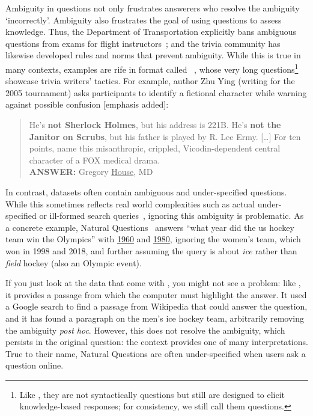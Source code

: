Ambiguity in questions not only frustrates answerers who resolve the ambiguity `incorrectly'.
Ambiguity also frustrates the goal of using questions to assess knowledge.
Thus, the  Department of Transportation explicitly bans ambiguous questions from exams for flight instructors~\cite{dot-08}; and the trivia community has likewise developed rules and norms that prevent ambiguity.
While this is true in many contexts, examples are rife in format called \qb{}~\cite{boyd-graber-12}, whose very long questions\footnote{Like \jeopardy{}, they are not syntactically questions but still are designed to elicit knowledge-based responses; for consistency, we still call them questions.} showcase trivia writers' tactics.
For example, \qb{} author Zhu Ying (writing for the 2005  tournament) asks participants to identify a fictional character while warning against possible confusion [emphasis added]:
\begin{quote}
 He's {\bf not Sherlock Holmes}, but his address is 221B. He's {\bf not the Janitor on Scrubs}, but his father is played by R. Lee Ermy. [\dots] For ten points, name this misanthropic, crippled, Vicodin-dependent central character of a FOX medical drama. \\
{\bf ANSWER:} Gregory \underline{House}, MD
\end{quote}

In contrast, \qa{} datasets often contain ambiguous and
under-specified questions.
While this sometimes reflects real world complexities such as actual
under-specified or ill-formed search
queries~\citep{faruqui-18,kwiatkowski-19}, ignoring this ambiguity is
problematic.
As a concrete example, Natural Questions~\cite[\nq{}]{kwiatkowski-19} answers ``what year did the us hockey team win the Olympics'' with \underline{1960} and \underline{1980}, ignoring the  women's team, which won in 1998 and 2018, and further assuming the query is about \emph{ice} rather than \emph{field} hockey (also an Olympic event).

If you just look at the data that come with \nq{}, you might not see a problem: like \squad{}, it provides a passage from which the computer must highlight the answer.
%
It used a Google search to find a passage from Wikipedia that could answer the question, and it has found a paragraph on the men's ice hockey team, arbitrarily removing the ambiguity \textit{post hoc}.
%
However, this does not resolve the ambiguity, which persists in the original question: the context provides one of many interpretations.
%
True to their name, Natural Questions are often under-specified when users ask a question online.

